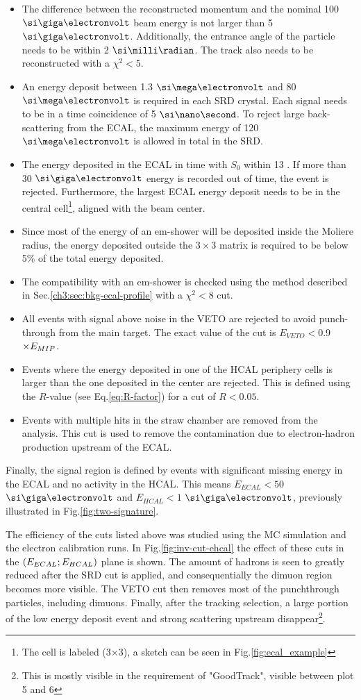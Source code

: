 \begin{itemize}
\item The difference between the reconstructed momentum and the nominal 100 $\gev$ beam energy is not larger than 5 $\gev$. Additionally, the entrance angle of the particle needs to be within 2 $\mrad$. The track also needs to be reconstructed with a $\chi^2<5$.
\item An energy deposit between 1.3 $\mev$ and 80 $\mev$ is required in each SRD crystal. Each signal needs to be in a time coincidence of 5 $\nas$. To reject large back-scattering from the ECAL, the maximum energy of 120 $\mev$ is allowed in total in the SRD.
\item The energy deposited in the ECAL in time with $S_0$ within 13 \nas. If more than 30 $\gev$ energy is recorded out of time, the event is rejected. Furthermore, the largest ECAL energy deposit needs to be in the central cell\footnote{The cell is labeled (3$\times$3), a sketch can be seen in Fig.\ref{fig:ecal_example}}, aligned with the beam center. 
\item Since most of the energy of an em-shower will be deposited inside the Moliere radius, the energy deposited outside the $3\times3$ matrix is required to be below 5\% of the total energy deposited. 
\item The compatibility with an em-shower is checked using the method described in Sec.\ref{ch3:sec:bkg-ecal-profile} with a $\chi^2 < 8$ cut.
\item All events with signal above noise in the VETO are rejected to avoid punch-through from the main target. The exact value of the cut is $E_{VETO} <$0.9$\times E_{MIP}$.
\item Events where the energy deposited in one of the HCAL periphery cells is larger than the one deposited in the center are rejected. This is defined using the $R$-value (see Eq.\ref{eq:R-factor}) for a cut of $R < 0.05$.
\item Events with multiple hits in the straw chamber are removed from the analysis. This cut is used to remove the contamination due to electron-hadron production upstream of the ECAL.
\end{itemize}

Finally, the signal region is defined by events with significant missing energy in the ECAL and no activity in the HCAL. This means $E_{ECAL} < 50$ $\gev$ and $E_{HCAL} < 1$ $\gev$, previously illustrated in Fig.\ref{fig:two-signature}.

The efficiency of the cuts listed above was studied using the MC simulation and the electron calibration runs.
In Fig.\ref{fig:inv-cut-ehcal} the effect of these cuts in the $(E_{ECAL};E_{HCAL})$ plane is shown.
The amount of hadrons is seen to greatly reduced after the SRD cut is applied, and consequentially the dimuon region becomes more visible. The VETO cut then removes most of the punchthrough particles, including dimuons. Finally, after the tracking selection, a large portion of the low energy deposit event and strong scattering upstream disappear\footnote{This is mostly visible in the requirement of "GoodTrack", visible between plot 5 and 6}.


